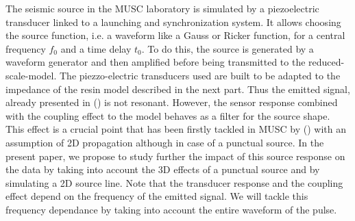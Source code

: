 \documentclass[extra,mreferee]{gji}
\begin{document}
The seismic source in the MUSC laboratory is simulated by a piezoelectric transducer linked to a launching and synchronization system. It allows choosing the source function, i.e. a waveform like a Gauss or Ricker function, for a central frequency $f_{0}$ and a time delay $t_{0}$. To do this, the source is generated by a waveform generator and then amplified before being transmitted to the reduced-scale-model. {\color{magenta}The piezzo-electric transducers used are built to be adapted to the impedance of the resin model described in the next part. Thus the emitted signal, already presented in (\cite{bretaudeau2011ssm}) is not resonant. However, the sensor response combined with the coupling effect to the model behaves as a filter for the source shape. This effect is a crucial point that has been firstly tackled in MUSC by (\cite{bretaudeau2011ssm}) with an assumption of 2D propagation although in case of a punctual source. In the present paper, we propose to study further the impact of this source response on the data by taking into account the 3D effects of a punctual source and by simulating a 2D source line. Note that the transducer response and the coupling effect depend on the frequency of the emitted signal. We will tackle this frequency dependance by taking into account the entire waveform of the pulse.}
\end{document}
